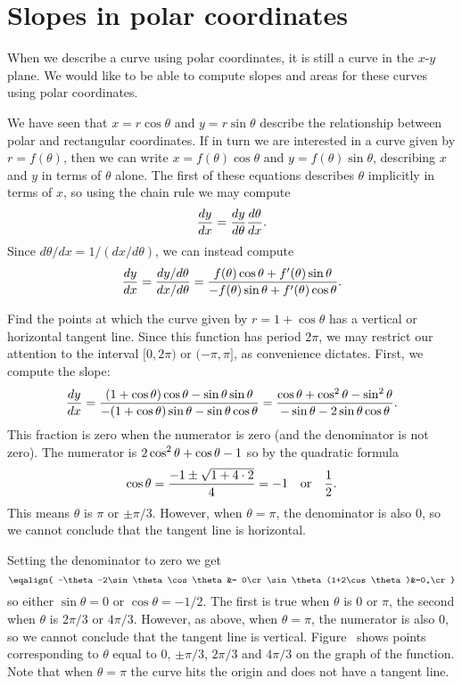 \section{Slopes in polar coordinates}{}{}
\nobreak
When we describe a curve using polar coordinates, it is still a curve
in the $x$-$y$ plane. We would like to be able to compute slopes and
areas for these curves using polar coordinates.

We have seen that $x=r\cos\theta$ and $y=r\sin\theta$ describe the
relationship between polar and rectangular coordinates. If in turn we
are interested in a curve given by $r=f(\theta)$, then we can write
$x=f(\theta)\cos\theta$ and $y=f(\theta)\sin\theta$, describing $x$
and $y$ in terms of $\theta$ alone. The first of these equations
describes $\theta$ implicitly in terms of $x$, so using the chain rule
we may compute
$${dy\over dx}={dy\over d\theta}{d\theta\over dx}.$$
Since $d\theta/dx=1/(dx/d\theta)$, we can instead compute
$$
  {dy\over dx}={dy/d\theta\over dx/d\theta}=
  {f(\theta)\cos\theta + f'(\theta)\sin\theta\over
  -f(\theta)\sin\theta + f'(\theta)\cos\theta}.
$$

\example Find the points at which the curve given by
$r=1+\cos\theta$ has a vertical or horizontal tangent line. Since this
function has period $2\pi$, we may restrict our attention to the
interval $[0,2\pi)$ or $(-\pi,\pi]$, as convenience dictates.
First, we compute the slope:
$$
  {dy\over dx}={(1+\cos\theta)\cos\theta-\sin\theta\sin\theta\over
    -(1+\cos\theta)\sin\theta-\sin\theta\cos\theta}=
  {\cos\theta+\cos^2\theta-\sin^2\theta\over
    -\sin\theta-2\sin\theta\cos\theta}.
$$
This fraction is zero when the numerator is zero (and the denominator
is not zero). The numerator is $\displaystyle \displaystyle 2\cos^2\theta+\cos\theta-1$ so by the
quadratic formula
$$
  \cos\theta={-1\pm\sqrt{1+4\cdot2}\over 4} = -1 
  \quad\hbox{or}\quad {1\over 2}.
$$
This means $\theta$ is $\pi$ or $\pm \pi/3$.
However, when $\theta=\pi$, the denominator is
also $0$, so we cannot conclude that the tangent line is horizontal. 

Setting the denominator to zero we get
$$\eqalign{
  -\theta-2\sin\theta\cos\theta &= 0\cr
  \sin\theta(1+2\cos\theta)&=0,\cr}
$$ 
so either $\sin\theta=0$ or $\cos\theta=-1/2$. The first is true when
$\theta$ is $0$ or $\pi$, the second when $\theta$ is $2\pi/3$ or
$4\pi/3$. However, as above, when $\theta=\pi$, the numerator is also $0$, so we
cannot conclude that the tangent line is
vertical. Figure~ shows points
corresponding to $\theta$ equal to $0$, $\pm\pi/3$, $2\pi/3$ and
$4\pi/3$ on the graph of the function. Note that when $\theta=\pi$ the
curve hits the origin and does not have a tangent line.
\endexample

